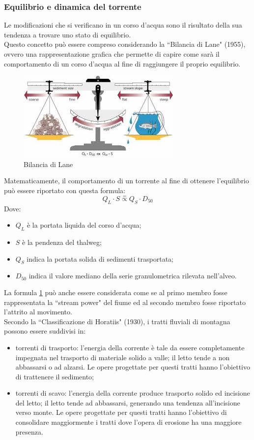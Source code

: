 \subsubsection{Equilibrio e dinamica del torrente}
Le modificazioni che si verificano in un corso d'acqua sono il risultato della sua tendenza a trovare uno stato di equilibrio.\\
Questo concetto può essere compreso considerando la ``Bilancia di Lane" (1955), ovvero una rappresentazione grafica che permette di capire come sarà il comportamento di un corso d'acqua al fine di raggiungere il proprio equilibrio.
\begin{figure}[H]  \centering
    \includegraphics[scale=1]{immagini/bilancia_lane.jpg}
    \caption{Bilancia di Lane}
    \label{bilancia_lane}
\end{figure}
Matematicamente, il comportamento di un torrente al fine di ottenere l'equilibrio può essere riportato con questa formula:
\begin{equation}
    Q_L \cdot S \overset{=}{\propto} Q_S \cdot D_{50}
    \label{bilancia_lane}
\end{equation}
Dove:
\begin{itemize}
    \item $Q_L$ è la portata liquida del corso d'acqua;
    \item $S$ è la pendenza del thalweg;
    \item $Q_S$ indica la portata solida di sedimenti trasportata;
    \item $D_{50}$ indica il valore mediano della serie granulometrica rilevata nell'alveo.
\end{itemize}
La formula \ref{bilancia_lane} può anche essere considerata come se al primo membro fosse rappresentata la ``stream power" del fiume ed al secondo membro fosse riportato l'attrito al movimento.\\
Secondo la ``Classificazione di Horatiis" (1930), i tratti fluviali di montagna possono essere suddivisi in:
\begin{itemize}
    \item torrenti di trasporto: l'energia della corrente è tale da essere completamente impegnata nel trasporto di materiale solido a valle; il letto tende a non abbassarsi o ad alzarsi. Le opere progettate per questi tratti hanno l'obiettivo di trattenere il sedimento;
    \item torrenti di scavo: l'energia della corrente produce trasporto solido ed incisione del letto; il letto tende ad abbassarsi, generando una tendenza all'incisione verso monte. Le opere progettate per questi tratti hanno l'obiettivo di consolidare maggiormente i tratti dove l'opera di erosione ha una maggiore presenza.
\end{itemize}

